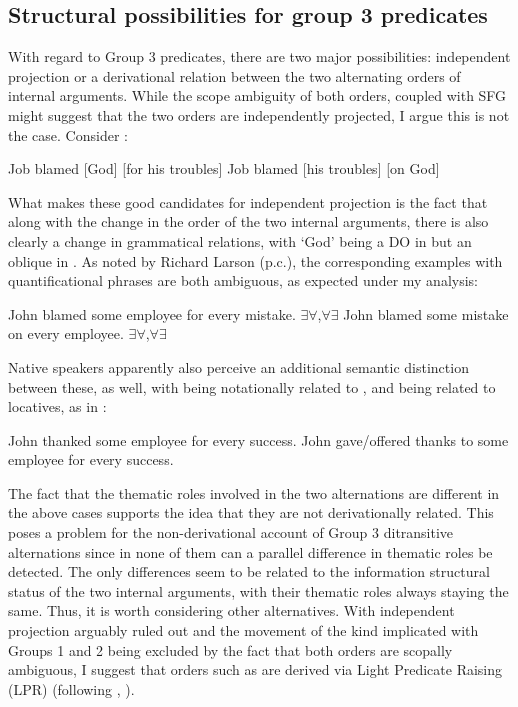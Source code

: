 \documentclass[output=paper,colorlinks,citecolor=brown,modfonts,nonflat]{langsci/langscibook}
\begin{document}
\subsection{Structural possibilities for group 3 predicates}\label{sec:antonyuk:4.3}

With regard to Group 3 predicates, there are two major possibilities: independent projection or a derivational relation between the two alternating orders of internal arguments. While the scope ambiguity of both orders, coupled with SFG might suggest that the two orders are independently projected, I argue this is not the case. Consider :


\ea%
    \label{ex:antonyuk:56}
    \ea \label{ex:antonyuk:56a}
    Job blamed [God] [for his troubles] \hfill \citep{Larson1990}
    \ex \label{ex:antonyuk:56b}
    Job blamed [his troubles] [on God]
    \z
\z

What makes these good candidates for independent projection is the fact that along with the change in the order of the two internal arguments, there is also clearly a change in grammatical relations, with ‘God’ being a DO in  but an oblique in . As noted by Richard Larson (p.c.), the corresponding examples with quantificational phrases are both ambiguous, as expected under my analysis:

\ea%
    \label{ex:antonyuk:57}
    \ea \label{ex:antonyuk:57a}
    John blamed some employee for every mistake. \hfill ${\exists}{\forall}$,${\forall}{\exists}$
    \ex \label{ex:antonyuk:57b}
    John blamed some mistake on every employee. \hfill ${\exists}{\forall}$,${\forall}{\exists}$
    \z
\z

Native speakers apparently also perceive an additional semantic distinction between these, as well, with  being notationally related to , and  being related to locatives, as in :


\ea%
    \label{ex:antonyuk:58}
    \ea \label{ex:antonyuk:58a}
    John thanked some employee for every success.
    \ex \label{ex:antonyuk:58b}
    John gave/offered thanks to some employee for every success.
    \z
\z

The fact that the thematic roles involved in the two alternations are different in the above cases supports the idea that they are not derivationally related. This poses a problem for the non-derivational account of Group 3 ditransitive alternations since in none of them can a parallel difference in thematic roles be detected. The only differences seem to be related to the information structural status of the two internal arguments, with their thematic roles always staying the same. Thus, it is worth considering other alternatives. With independent projection arguably ruled out and the movement of the kind implicated with Groups 1 and 2 being excluded by the fact that both orders are scopally ambiguous, I suggest that orders such as  are derived via Light Predicate Raising (LPR) (following \citealt{Larson1989}, \citeyear{Larson2014}).
\end{document}
